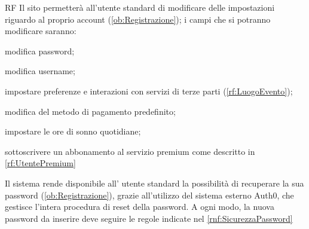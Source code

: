 \begin{listaPersonale}{RF}
	 Il sito permetterà all'utente standard di modificare delle impostazioni riguardo al proprio account (\ref{ob:Registrazione}); i campi che si potranno modificare saranno:
	\begin{listaPersonale2}[RF]{}
		 modifica password;

		 modifica username;

		 impostare preferenze e interazioni con servizi di terze parti (\ref{rf:LuogoEvento});

		 modifica del metodo di pagamento predefinito;

		 impostare le ore di sonno quotidiane;

		 sottoscrivere un abbonamento al servizio premium come descritto in \ref{rf:UtentePremium}
	\end{listaPersonale2}

	        Il sistema rende disponibile all' utente standard la possibilità di recuperare la sua password (\ref{ob:Registrazione}), grazie all'utilizzo del sistema esterno Auth0, che gestisce l'intera procedura di reset della password. A ogni modo, la nuova password da inserire deve seguire le regole indicate nel  \ref{rnf:SicurezzaPassword}
	        \begin{comment}
	        fornendo alla piattaforma la propria email con cui si è registrati. Il sistema manderà un'email all'indirizzo fornito, in cui sarà presente un link che porterà a una pagina dove si potrà reimpostare la propria password. La nuova password da inserire deve seguire le regole indicate nel  \ref{rnf:SicurezzaPassword}. %
	        \end{comment}
\end{listaPersonale}